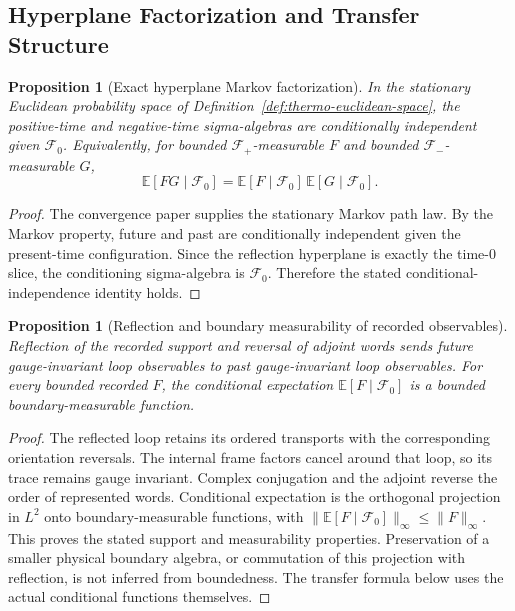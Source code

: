 \documentclass[11pt]{article}
\newtheorem{proposition}[theorem]{Proposition}
\theoremstyle{definition}
\theoremstyle{remark}
\begin{document}
\subsection{Hyperplane Factorization and Transfer Structure}

\begin{proposition}[Exact hyperplane Markov factorization]
\label{prop:hyperplane-factorization}
In the stationary Euclidean probability space of
Definition~\ref{def:thermo-euclidean-space}, the positive-time and
negative-time sigma-algebras are conditionally independent given
$\mathcal F_0$.  Equivalently, for bounded $\mathcal F_+$-measurable $F$ and
bounded $\mathcal F_-$-measurable $G$,
\[
\mathbb E[FG\mid\mathcal F_0]
=
\mathbb E[F\mid\mathcal F_0]\,
\mathbb E[G\mid\mathcal F_0].
\]
\end{proposition}

\begin{proof}
The convergence paper supplies the stationary Markov path law.  By the Markov
property, future and past are conditionally independent given the present-time
configuration.  Since the reflection hyperplane is exactly the time-$0$ slice,
the conditioning sigma-algebra is $\mathcal F_0$.  Therefore the stated
conditional-independence identity holds.
\end{proof}

\begin{proposition}[Reflection and boundary measurability of recorded observables]
\label{prop:reflection-stability}
Reflection of the recorded support and reversal of adjoint words sends
future gauge-invariant loop observables to past gauge-invariant loop
observables. For every bounded recorded $F$, the conditional expectation
$\mathbb E[F\mid\mathcal F_0]$ is a bounded boundary-measurable function.
\end{proposition}

\begin{proof}
The reflected loop retains its ordered transports with the corresponding
orientation reversals. The internal frame factors cancel around that loop,
so its trace remains gauge invariant. Complex conjugation and the adjoint
reverse the order of represented words. Conditional expectation is the
orthogonal projection in $L^2$ onto boundary-measurable functions, with
$\|\mathbb E[F\mid\mathcal F_0]\|_\infty\le\|F\|_\infty$.
This proves the stated support and measurability properties. Preservation
of a smaller physical boundary algebra, or commutation of this projection
with reflection, is not inferred from boundedness. The transfer formula
below uses the actual conditional functions themselves.
\end{proof}
\end{document}
